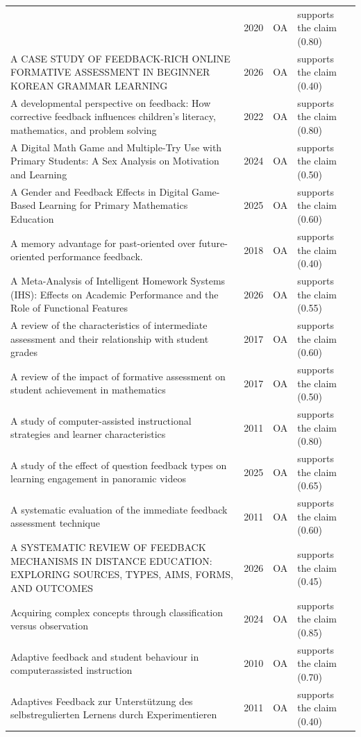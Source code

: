 \begin{longtable}{@{}%
  >{\raggedright\arraybackslash}p{}c%
  >{\raggedright\arraybackslash}p{}%
  >{\raggedright\arraybackslash}p{}@{}}
 4 & 2020 & OA & supports the claim (0.80) \\
A CASE STUDY OF FEEDBACK-RICH ONLINE FORMATIVE ASSESSMENT IN BEGINNER KOREAN GRAMMAR LEARNING & 2026 & OA & supports the claim (0.40) \\
A developmental perspective on feedback: How corrective feedback influences children's literacy, mathematics, and problem solving & 2022 & OA & supports the claim (0.80) \\
A Digital Math Game and Multiple-Try Use with Primary Students: A Sex Analysis on Motivation and Learning & 2024 & OA & supports the claim (0.50) \\
A Gender and Feedback Effects in Digital Game-Based Learning for Primary Mathematics Education & 2025 & OA & supports the claim (0.60) \\
A memory advantage for past-oriented over future-oriented performance feedback. & 2018 & OA & supports the claim (0.40) \\
A Meta-Analysis of Intelligent Homework Systems (IHS): Effects on Academic Performance and the Role of Functional Features & 2026 & OA & supports the claim (0.55) \\
A review of the characteristics of intermediate assessment and their relationship with student grades & 2017 & OA & supports the claim (0.60) \\
A review of the impact of formative assessment on student achievement in mathematics & 2017 & OA & supports the claim (0.50) \\
A study of computer-assisted instructional strategies and learner characteristics & 2011 & OA & supports the claim (0.80) \\
A study of the effect of question feedback types on learning engagement in panoramic videos & 2025 & OA & supports the claim (0.65) \\
A systematic evaluation of the immediate feedback assessment technique & 2011 & OA & supports the claim (0.60) \\
A SYSTEMATIC REVIEW OF FEEDBACK MECHANISMS IN DISTANCE EDUCATION: EXPLORING SOURCES, TYPES, AIMS, FORMS, AND OUTCOMES & 2026 & OA & supports the claim (0.45) \\
Acquiring complex concepts through classification versus observation & 2024 & OA & supports the claim (0.85) \\
Adaptive feedback and student behaviour in computerassisted instruction & 2010 & OA & supports the claim (0.70) \\
Adaptives Feedback zur Unterstützung des selbstregulierten Lernens durch Experimentieren & 2011 & OA & supports the claim (0.40) \\

\end{longtable}
